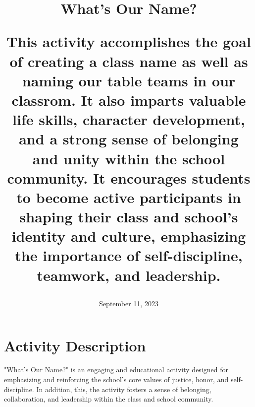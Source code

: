 \documentclass[14pt, letterpaper, twoside]{article}
\title{\textbf{What's Our Name?}
	\begin{spacing}{1.5}
	This activity accomplishes the goal of creating a class name as well as naming our table teams in our classrom. It also imparts valuable life skills,
	character development, and a strong sense of belonging and unity within the school community. It encourages students to become active participants in
	shaping their class and  school's identity and culture, emphasizing the importance of self-discipline, teamwork, and leadership.
	\end{spacing}}
\date{}
\author{September 11, 2023}
\begin{document}
	
		\begin{titlepage}
		\maketitle
		\thispagestyle{empty}
		\end{titlepage}
	\pagestyle{headings}
	\fancyhf{}
	\fancyhead[R]{\thepage}
	\pagestyle{fancy}
	\renewcommand{\footrulewidth}{1 px}
	\newpage
	\tableofcontents
	\thispagestyle{empty}
	\newpage

\section{Activity Description}
"What's Our Name?" is an engaging and educational activity designed for emphasizing and reinforcing the school's core values of justice, honor, and self-discipline. In addition, this, the activity fosters a sense of belonging, collaboration, and leadership within the class and school community.
\end{document}
